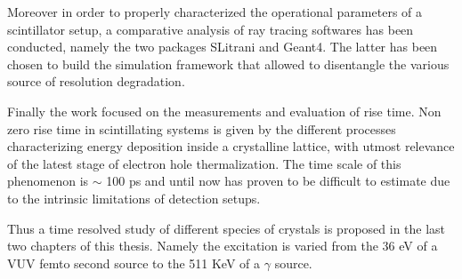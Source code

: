 Moreover in order to properly characterized the operational parameters of a scintillator setup, a comparative analysis of ray tracing softwares has been conducted, namely the two packages SLitrani and Geant4. The latter has been chosen to build the simulation framework that allowed to disentangle the various source of resolution degradation.

Finally the work focused on the measurements and evaluation of rise time. Non zero rise time in scintillating systems is given by the different processes characterizing energy deposition inside a crystalline lattice, with utmost relevance of the latest stage of electron hole thermalization. The time scale of this phenomenon is $\sim$ 100 ps and until now has proven to be difficult to estimate due to the intrinsic limitations of detection setups.

Thus a time resolved study of different species of crystals is proposed in the last two chapters of this thesis. Namely the excitation is varied from the 36 eV of a VUV femto second source to the 511 KeV of a $\gamma$ source. 



